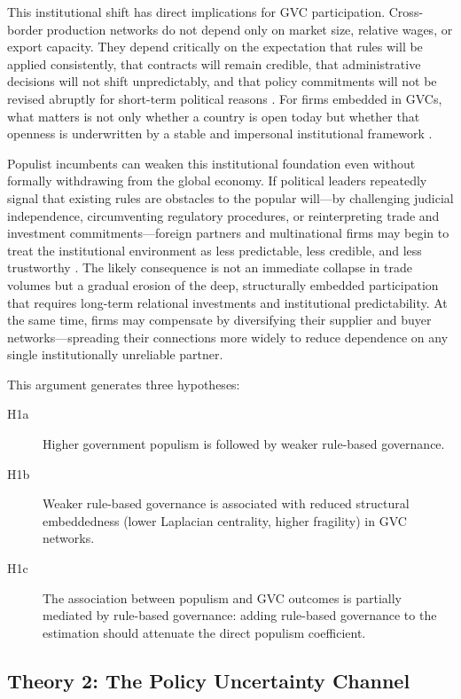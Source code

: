 \documentclass[12pt]{article}
\begin{document}
This institutional shift has direct implications for GVC participation. Cross-border production networks do not depend only on market size, relative wages, or export capacity. They depend critically on the expectation that rules will be applied consistently, that contracts will remain credible, that administrative decisions will not shift unpredictably, and that policy commitments will not be revised abruptly for short-term political reasons \citep{north1990, milner1997, keohane1977, ruggie1982}. For firms embedded in GVCs, what matters is not only whether a country is open today but whether that openness is underwritten by a stable and impersonal institutional framework \citep{antras2013, hallsoskice2001, acemoglu2001}.

Populist incumbents can weaken this institutional foundation even without formally withdrawing from the global economy. If political leaders repeatedly signal that existing rules are obstacles to the popular will---by challenging judicial independence, circumventing regulatory procedures, or reinterpreting trade and investment commitments---foreign partners and multinational firms may begin to treat the institutional environment as less predictable, less credible, and less trustworthy \citep{buthemilner2008, julio2012, bloom2009}. The likely consequence is not an immediate collapse in trade volumes but a gradual erosion of the deep, structurally embedded participation that requires long-term relational investments and institutional predictability. At the same time, firms may compensate by diversifying their supplier and buyer networks---spreading their connections more widely to reduce dependence on any single institutionally unreliable partner.

This argument generates three hypotheses:

\begin{description}
  \item[H1a] Higher government populism is followed by weaker rule-based governance.
  \item[H1b] Weaker rule-based governance is associated with reduced structural embeddedness (lower Laplacian centrality, higher fragility) in GVC networks.
  \item[H1c] The association between populism and GVC outcomes is partially mediated by rule-based governance: adding rule-based governance to the estimation should attenuate the direct populism coefficient.
\end{description}

\subsection{Theory 2: The Policy Uncertainty Channel}
\end{document}
